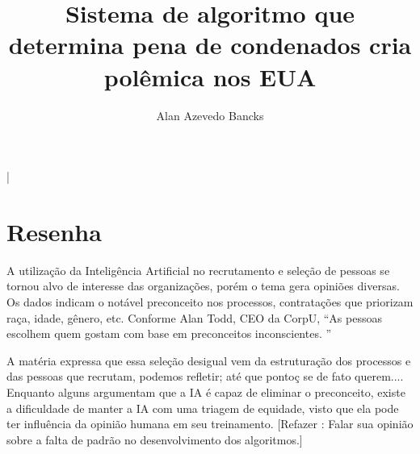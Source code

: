 \documentclass[11pt,twocolumn]{article}
\title{Sistema de algoritmo que determina pena de condenados cria polêmica nos EUA}
\author{Alan Azevedo Bancks}
\begin{document}
\maketitle

|%



\section{Resenha}


A utilização da Inteligência Artificial no recrutamento e seleção de pessoas se tornou alvo de interesse das organizações, porém o tema gera opiniões diversas.
Os dados indicam o notável preconceito nos processos, contratações que priorizam raça, idade, gênero, etc. Conforme Alan Todd, CEO da CorpU, “As pessoas escolhem quem gostam com base em preconceitos inconscientes. ”

A matéria expressa que essa seleção desigual vem da estruturação dos processos e das pessoas que recrutam, podemos refletir; até que pontoç se de fato querem....
Enquanto alguns argumentam que a IA é capaz de eliminar o preconceito, existe a dificuldade de manter a IA com uma triagem de equidade, visto que ela pode ter influência da opinião humana em seu treinamento.
[Refazer : Falar sua opinião sobre a falta de padrão no desenvolvimento dos algoritmos.]
\end{document}
